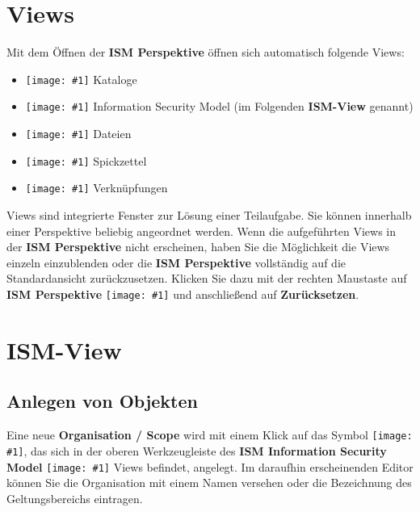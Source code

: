 \documentclass[a4paper,10pt]{book}
\newcommand{\icon}[1]{\texttt{[image: \#1]}}
\begin{document}
\section{Views}
Mit dem Öffnen der \textbf{ISM Perspektive} öffnen sich automatisch folgende Views:
\begin{itemize}
\item \icon{Icon/bp_catalog} Kataloge
\item \icon{Icon/Informationssicherheitsmodell.png} Information Security Model (im Folgenden \textbf{ISM-View} genannt)
\item \icon{Icon/Hinzufuegen.png} Dateien
\item \icon{Icon/Cheatsheet_view.png} Spickzettel
\item \icon{Icon/Verknuepfungen.png} Verknüpfungen
\end{itemize}
Views sind integrierte Fenster zur Lösung einer Teilaufgabe. Sie können innerhalb einer Perspektive beliebig angeordnet werden.
Wenn die aufgeführten Views in der \textbf{ISM Perspektive} nicht erscheinen, haben Sie die Möglichkeit die Views einzeln einzublenden oder die
\textbf{ISM Perspektive} vollständig auf die Standardansicht zurückzusetzen. Klicken Sie dazu mit der rechten Maustaste auf \textbf{ISM Perspektive}
\icon{Icon/Informationssicherheitsmodell.png} und anschließend auf \textbf{Zurücksetzen}.

\section{ISM-View}

\subsection{Anlegen von Objekten} \label{Anlegen von Objekten}
Eine neue \textbf{Organisation / Scope} wird mit einem Klick auf das Symbol \icon{Icon/Oeffnen.png},
das sich in der oberen Werkzeugleiste des \textbf{ISM Information Security Model} \icon{Icon/Informationssicherheitsmodell.png} Views befindet, angelegt.
Im daraufhin erscheinenden Editor können Sie die Organisation mit einem Namen versehen oder die Bezeichnung des Geltungsbereichs eintragen.
\end{document}
